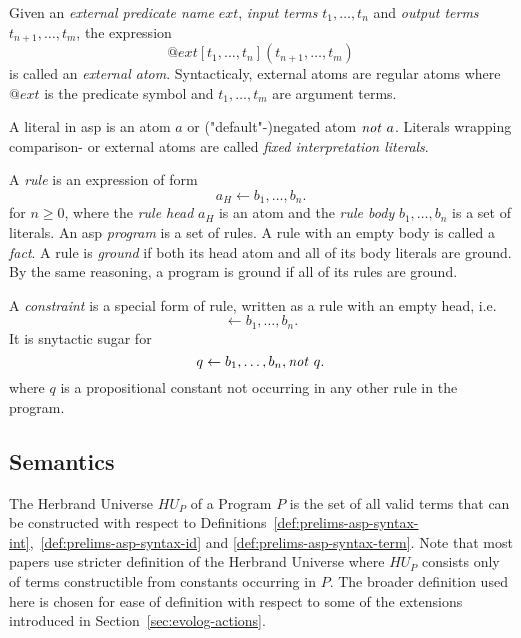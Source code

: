 \begin{definition}
\label{def:prelims-asp-syntax-ext-atom}
Given an \emph{external predicate name} $\mathit{ext}$, \emph{input terms} $t_1,\ldots,t_n$ and \emph{output terms} $t_{n+1},\ldots,t_m$, the expression
\[
	@\mathit{ext}[t_1,\ldots,t_n](t_{n+1},\ldots,t_m)
\]
is called an \emph{external atom}. Syntacticaly, external atoms are regular atoms where $@\mathit{ext}$ is the predicate symbol and $t_1,\ldots,t_m$ are argument terms.
\end{definition}

\begin{definition}[Literal]
\label{def:prelims-asp-syntax-literal}
A literal in \gls{asp} is an atom $a$ or ("default"-)negated atom $\mathit{not}\ a$. Literals wrapping comparison- or external atoms are called \emph{fixed interpretation literals}.
\end{definition}

\begin{definition}
\label{def:prelims-asp-syntax-rule}
A \emph{rule} is an expression of form
\[
	a_H \leftarrow b_1,\ldots,b_n.
\]
for $n \geq 0$, where the \emph{rule head} $a_H$ is an atom and the \emph{rule body} $b_1,\ldots,b_n$ is a set of literals. An \gls{asp} \emph{program} is a set of rules. A rule with an empty body is called a \emph{fact}. A rule is \emph{ground} if both its head atom and all of its body literals are ground. By the same reasoning, a program is ground if all of its rules are ground.
\end{definition}


\begin{definition}[Constraint]
\label{def:prelims-asp-syntax-constraint}
A \emph{constraint} is a special form of rule, written as a rule with an empty head, i.e.
\[
	\leftarrow b_1,\ldots,b_n.
\]
It is snytactic sugar for
\[
	q \leftarrow b_1,\ldots,b_n, \mathit{not}\ q.
\]
where $q$ is a propositional constant not occurring in any other rule in the program.
\end{definition}

\subsection{Semantics}
\label{subsec:prelims-asp-semantics}

\begin{definition}
\label{def:prelims-asp-semantics-hu}
The Herbrand Universe $HU_P$ of a Program $P$ is the set of all valid terms that can be constructed with respect to Definitions~\ref{def:prelims-asp-syntax-int},~\ref{def:prelims-asp-syntax-id} and \ref{def:prelims-asp-syntax-term}.
Note that most papers use stricter definition of the Herbrand Universe where $HU_P$ consists only of terms constructible from constants occurring in $P$. The broader definition used here is chosen for ease of definition with respect to some of the extensions introduced in Section~\ref{sec:evolog-actions}.
\end{definition}

